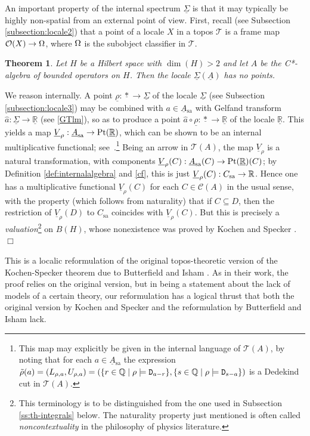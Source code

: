\documentclass[11pt]{article}
\newcommand{\raw}{\rightarrow} \newcommand{\rat}{\mapsto}
\newcommand{\er}{\eqref}
\newcommand{\rh}{\rho} \newcommand{\sg}{\sigma}
\newcommand{\CA}{{\mathcal A}} \newcommand{\CB}{{\mathcal B}}
\newcommand{\CO}{{\mathcal O}} \newcommand{\CP}{{\mathcal P}}
\newcommand{\CT}{{\mathcal T}} \newcommand{\CV}{{\mathcal V}}
\newcommand{\alg}[1]{\ensuremath{#1}}
\newcommand{\functor}[1]{\ensuremath{\underline{#1}}}
\newcommand{\context}{\ensuremath{\mathcal{C}}}
\newcommand{\asstopos}{\ensuremath{\mathcal{T}}}
\newcommand{\sa}{\ensuremath{_{\mathrm{sa}}}}
\newcommand{\prop}[1]{\ensuremath{\mbox{\texttt{#1}}}}
\newcommand{\field}[1]{\ensuremath{\mathbb{#1}}}
\newcommand{\uA}{\underline{A}}
\renewcommand{\CA}{\mathcal{C}(A)}
\newcommand{\TA}{\mathcal{T}(A)}
\newcommand{\ulS}{\functor{\Sigma}}
\newcommand{\ulR}{\underline{\mathbb{R}}}
\renewcommand{\TA}{\asstopos(\alg{A})}
\renewcommand{\CA}{\context(\alg{A})}
\newtheorem{theorem}{Theorem}
\newenvironment{proof}[1][Proof]%
{ \begin{trivlist}%
  \item[\hskip \labelsep {\bfseries #1}]%
}%
{ \end{trivlist}%
}
\newcommand{\qed}{\nobreak\hfill$\Box$}
\begin{document}
An important property of the  internal spectrum $\underline{\Sigma}$  is that it may
typically be
highly non-spatial from an external point of view. First, recall (see
Subsection \ref{subsection:locale2}) that a point of a locale
$X$ in a topos $\CT$ is a frame map $\CO(X)\raw\Om$, where $\Omega$ is the
subobject classifier in $\CT$.
\begin{theorem}
  \label{prop:kochenspecker}
  Let $H$ be a Hilbert space with $\dim(H)>2$ and let $\alg{A}$ be the
  C*-algebra of bounded operators on $H$. Then the locale $\ulS(\uA)$
  has no  points.
\end{theorem}
\begin{proof}
We reason internally. 
 A point $\underline{\rh}:\underline{*}\raw \ulS$  of the locale $\ulS$ (see Subsection \ref{subsection:locale3})
 may be combined with $a\in\uA\sa$ with Gelfand transform $\hat{a}:\ulS\raw \ulR$ (see \er{GTlm}),  so as to produce a point
 $\hat{a}\circ \underline{\rh}:\underline{*}\raw\ulR$ of the locale $\ulR$. This yields a map 
 $\underline{V}_{\rh}: \uA\sa \to\mathrm{Pt}(\underline\R)$, which can be shown to be an internal multiplicative functional;
see~\cite{banaschewskimulvey00a, banaschewskimulvey06, coquand05}.\footnote{This map
may explicitly be given in the internal language of $\TA$, by noting that
 for each  $a\in \uA\sa$ the expression $
    \tilde{\rh}(a)
  = (L_{\rh,a},U_{\rh,a})
  = (\{r \in \field{Q} \mid \rho \models \prop{D}_{a-r}\},
     \{s \in \field{Q} \mid \rho\models \prop{D}_{s-a} \})$ is a Dedekind
cut in $\TA$.} Being an arrow in $\TA$, the map $\underline{V}_{\rh}$
 is a natural transformation, with components $\underline{V}_{\rh}(C): \uA\sa(C) \raw\mathrm{Pt}(\underline\R)(C)$;
 by Definition \ref{def:internalalgebra} and \er{cf}, this is just  $\underline{V}_{\rh}(C):C\sa\raw \R$. 
 Hence one has a multiplicative functional $\underline{V}_{\rh}(C)$ for each $C\in\CA$ in
the usual sense,
with the property (which follows from naturality) that if $C\subseteq D$, then the restriction of  $\underline{V}_{\rh}(D)$
to $C\sa$ coincides with  $\underline{V}_{\rh}(C)$.
But this is precisely a {\it valuation}\footnote{This terminology is to be
distinguished from the one used in Subsection \ref{ss:th-integrals} below. The naturality property just mentioned is often called {\it noncontextuality} in the philosophy of physics literature.}  on
$B(H)$, whose nonexistence was proved by Kochen and Specker
\cite{kochenspecker67}. \qed
\end{proof}

This is a localic reformulation of the original topos-theoretic version of the
Kochen-Specker theorem due to Butterfield and Isham \cite{butterfieldisham1}. As
in their work, the proof relies on the original version, but in being a statement about the lack of models of a certain theory,  our reformulation has a logical thrust that both the original version by Kochen and Specker and the
reformulation by Butterfield and Isham lack. 
\end{document}
